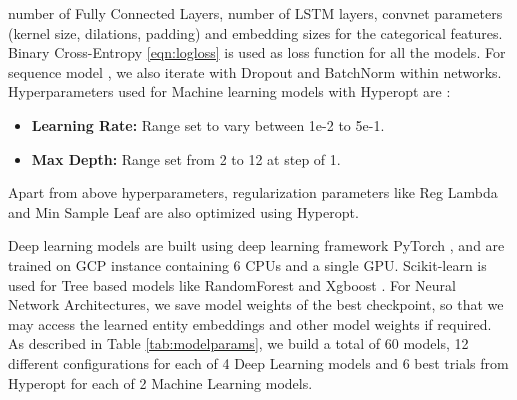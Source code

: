 number of Fully Connected Layers, number of LSTM layers, convnet parameters (kernel size, dilations, padding)
and embedding sizes for the categorical features. Binary Cross-Entropy \ref{eqn:logloss} is used as loss 
function for all the models. For sequence model \cite{sutskever2014sequence}, we also iterate with
Dropout \cite{hinton2012improving} and BatchNorm \cite{santurkar2018does} within networks.
Hyperparameters used for Machine learning models with Hyperopt \cite{bergstra2013hyperopt} are :
  \begin{itemize}
    \item {\bf Learning Rate:} Range set to vary between 1e-2 to 5e-1. 
    \item {\bf Max Depth:} Range set from 2 to 12 at step of 1.
  \end{itemize}
Apart from above hyperparameters, regularization parameters like Reg Lambda and Min Sample Leaf are also optimized using Hyperopt.

Deep learning models are built using deep learning framework
PyTorch \cite{paszke2017automatic}, and are trained on GCP instance containing 6 CPUs and a single GPU. 
Scikit-learn \cite{pedregosa2011scikit} is used for Tree
based models like RandomForest and Xgboost \cite{chen2016xgboost}. For Neural Network Architectures, 
we save model weights of the best checkpoint, so that we may access the learned entity embeddings and other
model weights if required. As described in Table \ref{tab:modelparams}, we build a total of 60 models, 
12 different configurations for each of 4 Deep Learning models and 6 best trials from Hyperopt \cite{bergstra2013hyperopt} 
for each of 2 Machine Learning models.
